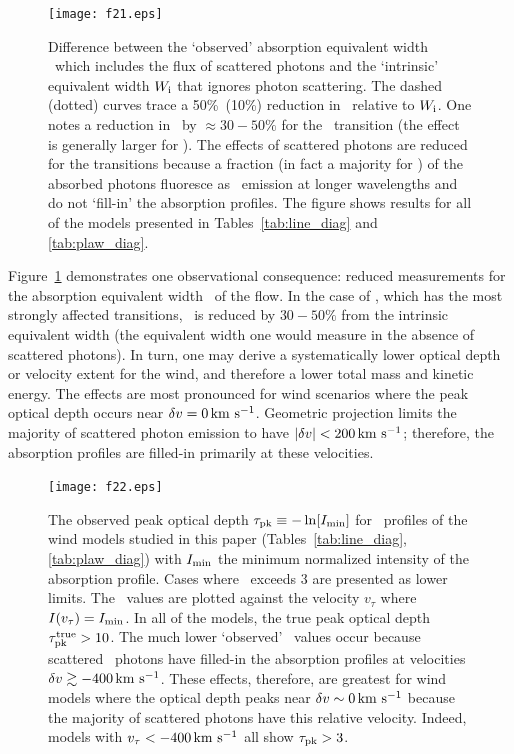 \documentclass[]{emulateapj}
\begin{document}
\begin{figure}
\texttt{[image: f21.eps]}
\caption{
Difference between the `observed' absorption equivalent width \ewabs\
which includes the flux of scattered photons and the `intrinsic'
equivalent width $W_{\rm i}$ that ignores photon scattering.  The
dashed (dotted) curves trace a 50\%\ (10\%) reduction in \ewabs\
relative to $W_{\rm i}$.  One notes a reduction in \ewabs\ by $\approx
30-50\%$ for the \mgiia\ transition (the effect is generally larger
for \mgiib).  The effects of scattered photons are reduced for the
\ion{Fe}{2} transitions because a fraction (in fact a majority for
\feiia) of the absorbed photons fluoresce as \feiis\ emission at
longer wavelengths and do not `fill-in' the absorption profiles.
The figure shows results for all of the models presented in
Tables~\ref{tab:line_diag} and \ref{tab:plaw_diag}.
}
\label{fig:obs_ew}
\end{figure}


Figure~\ref{fig:obs_ew} demonstrates one observational
consequence: reduced measurements for the absorption
equivalent width \ewabs\ of the flow.  In the case of ,
which has the most strongly affected transitions, \ewabs\ is reduced by
$30-50\%$ from the intrinsic equivalent width (the equivalent width
one would measure in the absence of scattered photons).  In turn, one may derive 
a systematically lower optical depth or velocity extent for the wind,
and therefore a lower total mass and kinetic energy.  
The effects are most pronounced for wind
scenarios where the peak optical depth occurs near $\delta v = 0 \, {\rm km~s^{-1}}$.
Geometric projection limits the majority of scattered photon emission to
have $|\delta v| < 200 \, {\rm km~s^{-1}}$; therefore,  the absorption profiles
are filled-in primarily at these velocities.  

\begin{figure}
\texttt{[image: f22.eps]}
\caption{
The observed peak optical depth $\tau_{\rm pk} \equiv -\ln [I_{\rm
  min}]$ for \mgiia\ profiles of the wind models studied in this paper
(Tables~\ref{tab:line_diag}, \ref{tab:plaw_diag}) with $I_{\rm min}$
the minimum normalized intensity of the absorption profile.  Cases
where \tpk\ exceeds 3 are presented as lower limits.  The \tpk\ values
are plotted against the velocity $v_\tau$ where $I(v_\tau) = I_{\rm min}$.  In all
of the models, the true peak optical depth $\tau_{\rm pk}^{\rm true} > 10$.
The much lower `observed' \tpk\ values occur because scattered \mgiia\
photons have filled-in the absorption profiles at velocities $\delta v
\gtrsim -400 \, {\rm km~s^{-1}}$. These effects, therefore, are greatest for wind
models where the optical depth peaks near $\delta v \sim 0 \, {\rm km~s^{-1}}$ because
the majority of scattered photons have this relative velocity.
Indeed, models with $v_\tau < -400 \, {\rm km~s^{-1}}$ all show $\tau_{\rm pk} > 3$.
}
\label{fig:obs_peaktau}
\end{figure}
\end{document}
